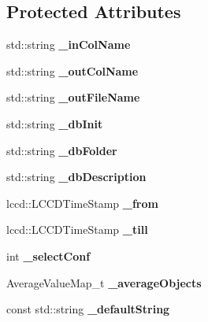 \subsection*{Protected Attributes}
\begin{DoxyCompactItemize}
\item 
std\-::string {\bfseries \-\_\-in\-Col\-Name}\label{classCALICE_1_1ExtractConfigurationAverageProcessor_a6d532e2cc4838f68332367733b4a0bd8}

\item 
std\-::string {\bfseries \-\_\-out\-Col\-Name}\label{classCALICE_1_1ExtractConfigurationAverageProcessor_a2c538c11dc9a34d75e7d2a843702f06b}

\item 
std\-::string {\bfseries \-\_\-out\-File\-Name}\label{classCALICE_1_1ExtractConfigurationAverageProcessor_ab9111f08e45c3959b0ed36aa49bc96aa}

\item 
std\-::string {\bfseries \-\_\-db\-Init}\label{classCALICE_1_1ExtractConfigurationAverageProcessor_a63aa312d9fb326bd9b868eed4d5d0e70}

\item 
std\-::string {\bfseries \-\_\-db\-Folder}\label{classCALICE_1_1ExtractConfigurationAverageProcessor_a634cc4a35f2b694cee63d1eff7e06ada}

\item 
std\-::string {\bfseries \-\_\-db\-Description}\label{classCALICE_1_1ExtractConfigurationAverageProcessor_a50d196cf146cde52ea5bb0481ce514a6}

\item 
lccd\-::\-L\-C\-C\-D\-Time\-Stamp {\bfseries \-\_\-from}\label{classCALICE_1_1ExtractConfigurationAverageProcessor_ab06f9eaf8c5bdfbecc67576231cf32cd}

\item 
lccd\-::\-L\-C\-C\-D\-Time\-Stamp {\bfseries \-\_\-till}\label{classCALICE_1_1ExtractConfigurationAverageProcessor_a6ca967970fd97f5134bb45760a1224f8}

\item 
int {\bfseries \-\_\-select\-Conf}\label{classCALICE_1_1ExtractConfigurationAverageProcessor_ac22b0611b66e8732f7b8927a8bbf70c6}

\item 
Average\-Value\-Map\-\_\-t {\bfseries \-\_\-average\-Objects}\label{classCALICE_1_1ExtractConfigurationAverageProcessor_a0fc2d84cee1e5dcb243653b8c2ac15fc}

\item 
const std\-::string {\bfseries \-\_\-default\-String}\label{classCALICE_1_1ExtractConfigurationAverageProcessor_a1f8e7e6467b59f155e0a50acfbf19859}

\end{DoxyCompactItemize}
